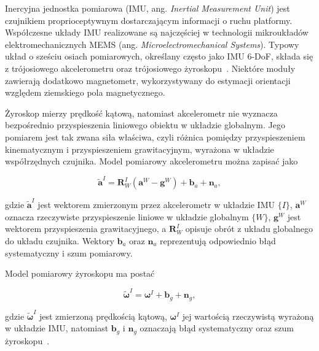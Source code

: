 \documentclass[a4paper,twoside,12pt]{book}
\begin{document}
Inercyjna jednostka pomiarowa (IMU, ang. \textit{Inertial Measurement Unit}) jest czujnikiem proprioceptywnym dostarczającym informacji o ruchu platformy. Współczesne układy IMU realizowane są najczęściej w technologii mikroukładów elektromechanicznych MEMS (ang. \textit{Microelectromechanical Systems}). Typowy układ o sześciu osiach pomiarowych, określany często jako IMU 6-DoF, składa się z trójosiowego akcelerometru oraz trójosiowego żyroskopu~\cite{mems_imu_calibration}. Niektóre moduły zawierają dodatkowo magnetometr, wykorzystywany do estymacji orientacji względem ziemskiego pola magnetycznego.

Żyroskop mierzy prędkość kątową, natomiast akcelerometr nie wyznacza bezpośrednio przyspieszenia liniowego obiektu w układzie globalnym. Jego pomiarem jest tak zwana siła właściwa, czyli różnica pomiędzy przyspieszeniem kinematycznym i przyspieszeniem grawitacyjnym, wyrażona w układzie współrzędnych czujnika. Model pomiarowy akcelerometru można zapisać jako

\begin{equation}
    \widetilde{\mathbf{a}}^{I}
    =
    \mathbf{R}^{I}_{W}
    \left(
        \mathbf{a}^{W} - \mathbf{g}^{W}
    \right)
    +
    \mathbf{b}_{a}
    +
    \mathbf{n}_{a},
    \label{eq:imu_accelerometer_model}
\end{equation}

gdzie $\widetilde{\mathbf{a}}^{I}$ jest wektorem zmierzonym przez akcelerometr w układzie IMU $\{I\}$, $\mathbf{a}^{W}$ oznacza rzeczywiste przyspieszenie liniowe w układzie globalnym $\{W\}$, $\mathbf{g}^{W}$ jest wektorem przyspieszenia grawitacyjnego, a $\mathbf{R}^{I}_{W}$ opisuje obrót z układu globalnego do układu czujnika. Wektory $\mathbf{b}_{a}$ oraz $\mathbf{n}_{a}$ reprezentują odpowiednio błąd systematyczny i szum pomiarowy.

Model pomiarowy żyroskopu ma postać

\begin{equation}
    \widetilde{\boldsymbol{\omega}}^{I}
    =
    \boldsymbol{\omega}^{I}
    +
    \mathbf{b}_{g}
    +
    \mathbf{n}_{g},
    \label{eq:imu_gyroscope_model}
\end{equation}

gdzie $\widetilde{\boldsymbol{\omega}}^{I}$ jest zmierzoną prędkością kątową, $\boldsymbol{\omega}^{I}$ jej wartością rzeczywistą wyrażoną w układzie IMU, natomiast $\mathbf{b}_{g}$ i $\mathbf{n}_{g}$ oznaczają błąd systematyczny oraz szum żyroskopu~\cite{imu_noise_modeling}.
\end{document}
